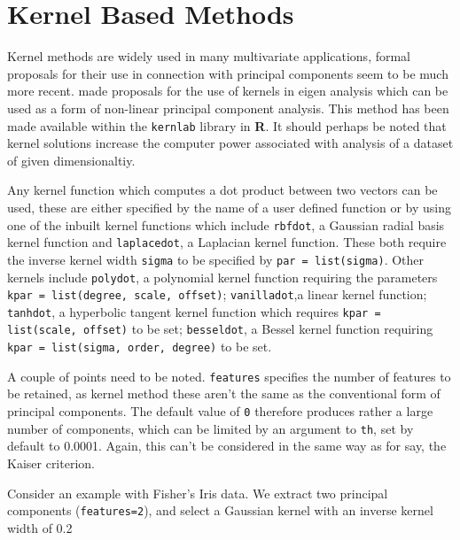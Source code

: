 \section{Kernel Based Methods}

Kernel methods are widely used in many multivariate applications, formal proposals for their use in connection with principal components seem to be much more recent.   \cite{Schoelkopf+etal:1998} made proposals for the use of kernels in eigen analysis which can be used as a form of non-linear principal component analysis.   This method has been made available within the \verb+kernlab+ library \cite{Karatzoglou+etal:2005} in \textbf{R}.   It should perhaps be noted that kernel solutions increase the computer power associated with analysis of a dataset of given dimensionaltiy.
   
Any kernel  function which computes a dot product between two vectors can be used, these are either specified by the name of a user defined function or by using one of the inbuilt kernel functions which include \verb+rbfdot+, a Gaussian radial basis kernel function and  \verb+laplacedot+, a Laplacian kernel function.   These  both require the inverse kernel width \verb+sigma+ to be specified by \verb+par = list(sigma)+.  Other kernels include \verb+polydot+, a polynomial kernel function requiring the parameters \verb+kpar = list(degree, scale, offset)+; \verb+vanilladot+,a linear kernel function; \verb+tanhdot+, a hyperbolic tangent kernel function which requires \verb+kpar = list(scale, offset)+ to be set; \verb+besseldot+, a Bessel kernel function requiring  \verb+kpar = list(sigma, order, degree)+ to be set.

A couple of points need to be noted.   \verb+features+ specifies the number of features to be retained, as  kernel method these aren't the same as the conventional form of principal components.   The default value of \verb+0+ therefore produces rather a large number of components, which can be limited by an argument to \verb+th+, set by default to 0.0001.   Again, this can't be considered in the same way as for say, the Kaiser criterion. 





Consider an example with Fisher's Iris data.   We extract two principal components (\verb+features=2+), and select a Gaussian kernel with an inverse kernel width of 0.2

